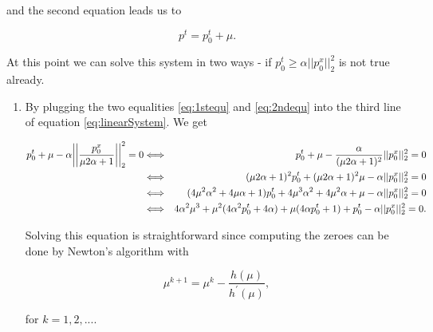         and the second equation leads us to

        \begin{equation}
            p^{t} = p_{0}^{t} + \mu. \label{eq:2ndequ}
        \end{equation}

        At this point we can solve this system in two ways - if $p_{0}^{t} \ge \alpha ||p_{0}^{x}||_{2}^{2}$ is not true already.
        \begin{enumerate}
            \item By plugging the two equalities \ref{eq:1stequ} and \ref{eq:2ndequ} into the third line of equation \ref{eq:linearSystem}. We get

        \begin{eqnarray}
            p_{0}^{t} + \mu - \alpha \bigg|\bigg|\frac{p_{0}^{x}}{\mu 2 \alpha + 1}\bigg|\bigg|_{2}^{2} = 0 &\Longleftrightarrow& p_{0}^{t} + \mu - \frac{\alpha}{(\mu 2 \alpha + 1)^{2}} ||p_{0}^{x}||_{2}^{2} = 0 \notag \\
            &\Longleftrightarrow& (\mu 2 \alpha + 1)^{2} p_{0}^{t} + (\mu 2 \alpha + 1)^{2} \mu - \alpha ||p_{0}^{x}||_{2}^{2} = 0 \notag \\
            &\Longleftrightarrow& (4 \mu^{2} \alpha^{2} + 4 \mu \alpha + 1) p_{0}^{t} + 4 \mu^{3} \alpha^{2} + 4 \mu^{2} \alpha + \mu - \alpha ||p_{0}^{x}||_{2}^{2} = 0 \notag \\
            &\Longleftrightarrow& 4 \alpha^{2} \mu^{3} + \mu^{2} (4 \alpha^{2} p_{0}^{t} + 4 \alpha) + \mu (4 \alpha p_{0}^{t} + 1) + p_{0}^{t} - \alpha ||p_{0}^{x}||_{2}^{2} = 0. \notag
        \end{eqnarray}

        Solving this equation is straightforward since computing the zeroes can be done by Newton's algorithm with

        \begin{equation}
            \mu^{k+1} = \mu^{k} - \frac{h(\mu)}{h^{'}(\mu)}, \label{eq:newton}
        \end{equation}

        for $k = 1, 2, ...$.


\end{enumerate}
